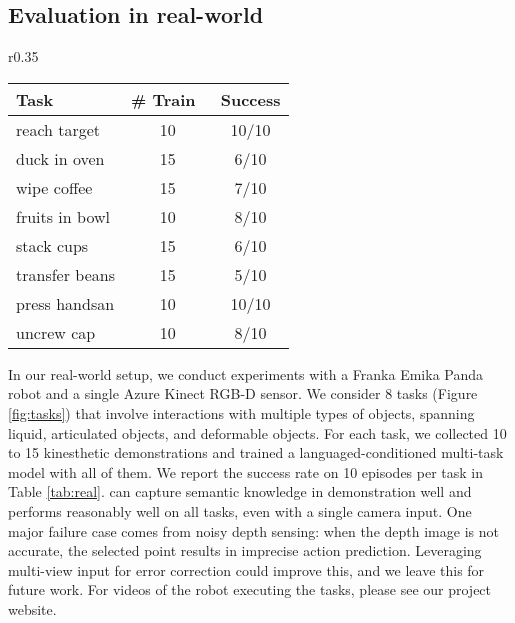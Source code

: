 \subsection{Evaluation in real-world}

\begin{wraptable}{r}{0.35\textwidth}
  \setlength\tabcolsep{2.3pt}
  \centering
\begin{tabular}{lcc} 
\toprule
Task          & \# Train~  & Success  \\ 
\midrule
reach target &10        & 10/10        \\
duck in oven &15           & 6/10        \\
wipe coffee   &15           & 7/10        \\
fruits in bowl & 10          & 8/10        \\
stack cups & 15            & 6/10        \\
transfer beans  & 15           & 5/10        \\
press handsan  & 10            & 10/10        \\
uncrew cap   & 10              & 8/10        \\
\bottomrule
\end{tabular}
    \caption{Real-world tasks.}
\label{tab:real}
\end{wraptable}In our real-world setup, we conduct experiments with a Franka Emika Panda robot and a single Azure Kinect RGB-D sensor. We consider 8 tasks (Figure \ref{fig:tasks}) that involve interactions with multiple types of objects, spanning liquid, articulated objects, and deformable objects. 
For each task, we collected 10 to 15 kinesthetic demonstrations
and trained a languaged-conditioned multi-task model with all of them. 
We report the success rate on 10 episodes per task in Table \ref{tab:real}. 
\model{} can capture semantic knowledge in demonstration well and performs reasonably well on all tasks, even with a single camera input. 
One major failure case comes from noisy depth sensing: when the depth image is not accurate, the selected point results in imprecise action prediction. 
Leveraging multi-view input for error correction could improve this, and we leave this for future work. For   videos of the robot executing the tasks, please see our project website.





